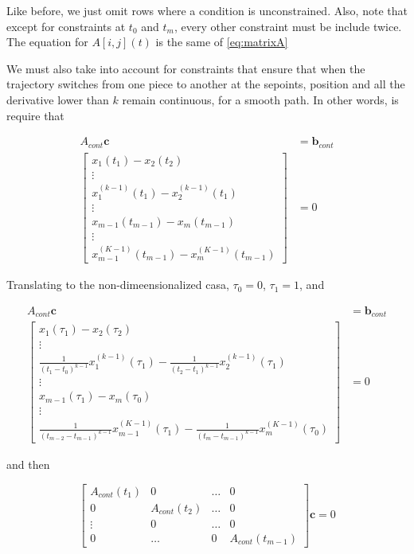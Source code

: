 \noindent Like before, we just omit rows where a condition is unconstrained. Also, note that except for constraints at $t_0$ and $t_m$, every other constraint must be include twice. The equation for $A[i,j](t)$ is the same of \eqref{eq:matrixA}

\noindent We must also take into account for constraints that ensure that when the trajectory switches from one piece to another at the sepoints, position and all the derivative lower than $k$ remain continuous, for a smooth path. In other words, is require that

\begin{align}
	A_{cont}\mathbf{c} &= \mathbf{b}_{cont} \\
	\begin{bmatrix}
		x_1(t_1)-x_2(t_2) 							  \\
		\vdots            							  \\
		x_1^{(k-1)}(t_1)-x_2^{(k-1)}(t_1) 			  \\
		\vdots                                        \\
		x_{m-1}(t_{m-1})-x_m(t_{m-1})                 \\
		\vdots                                        \\
		x_{m-1}^{(K-1)}(t_{m-1})-x_m^{(K-1)}(t_{m-1})
	\end{bmatrix} 
	&= 0 \nonumber
\end{align}

\noindent Translating to the non-dimeensionalized casa, $\tau_0=0$, $\tau_1=1$, and

\begin{align}
	A_{cont}\mathbf{c} &= \mathbf{b}_{cont} \\
	\begin{bmatrix}
		x_1(\tau_1)-x_2(\tau_2) \\
		\vdots \\
		\frac{1}{(t_1-t_0)^{k-1}}x_1^{(k-1)}(\tau_1)-\frac{1}{(t_2-t_1)^{k-1}}x_2^{(k-1)}(\tau_1) \\
		\vdots \\
		x_{m-1}(\tau_1)-x_m(\tau_0) \\
		\vdots \\
		\frac{1}{(t_{m-2}-t_{m-1})^{k-1}}x_{m-1}^{(K-1)}(\tau_1)-\frac{1}{(t_m-t_{m-1})^{k-1}}x_m^{(K-1)}(\tau_0)
	\end{bmatrix}
	&= 0 \nonumber
\end{align}

\noindent and then

\begin{equation}
	\begin{bmatrix}
		A_{cont}(t_1) & 0             & \dots & 0 \\
		0             & A_{cont}(t_2) &	\dots & 0 \\
		\vdots        & 0             & \dots & 0 \\
		0             & \dots         & 0     & A_{cont}(t_{m-1})  
	\end{bmatrix}
	\mathbf{c}=0
\end{equation}

